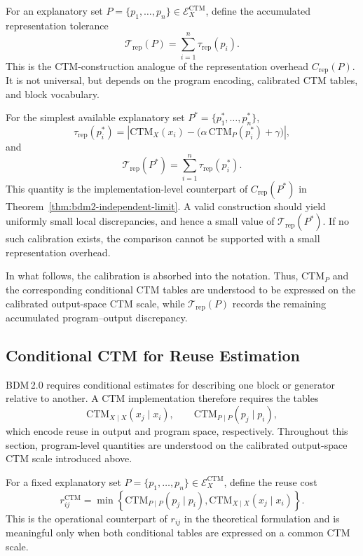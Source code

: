 \documentclass{article}
\begin{document}
For an explanatory set \(P=\{p_1,\ldots,p_n\}\in\mathcal E_X^{\mathrm{CTM}}\), define the accumulated representation tolerance 
\[ 
\mathcal T_{\mathrm{rep}}(P)
=
\sum_{i=1}^{n}\tau_{\mathrm{rep}}(p_i). 
\]
This is the CTM-construction analogue of the representation overhead \(C_{\mathrm{rep}}(P)\). It is not universal, but depends on the program encoding, calibrated CTM tables, and block vocabulary.

For the simplest available explanatory set \(P^*=\{p_1^*,\ldots,p_n^*\}\),
\[
\tau_{\mathrm{rep}}(p_i^*)
=
\left|
\mathrm{CTM}_X(x_i)
-
\bigl(\alpha\,\mathrm{CTM}_P(p_i^*)+\gamma\bigr)
\right|,
\]
and
\[
\mathcal T_{\mathrm{rep}}(P^*)
=
\sum_{i=1}^{n}\tau_{\mathrm{rep}}(p_i^*).
\]
This quantity is the implementation-level counterpart of \(C_{\mathrm{rep}}(P^*)\) in Theorem~\ref{thm:bdm2-independent-limit}. A valid construction should yield uniformly small local discrepancies, and hence a small value of \(\mathcal T_{\mathrm{rep}}(P^*)\). If no such calibration exists, the comparison cannot be supported with a small representation overhead.

In what follows, the calibration is absorbed into the notation. Thus, \(\mathrm{CTM}_P\) and the corresponding conditional CTM tables are understood to be expressed on the calibrated output-space CTM scale, while \(\mathcal T_{\mathrm{rep}}(P)\) records the remaining accumulated program--output discrepancy.


\subsection{Conditional CTM for Reuse Estimation}

BDM\,2.0 requires conditional estimates for describing one block or generator relative to another. A CTM implementation therefore requires the tables
\[
\mathrm{CTM}_{X\mid X}(x_j\mid x_i),
\qquad
\mathrm{CTM}_{P\mid P}(p_j\mid p_i),
\]
which encode reuse in output and program space, respectively. Throughout this section, program-level quantities are understood on the calibrated output-space CTM scale introduced above.

For a fixed explanatory set \(P=\{p_1,\ldots,p_n\}\in\mathcal E_X^{\mathrm{CTM}}\), define the reuse cost
\[
r_{ij}^{\mathrm{CTM}}
=
\min
\left\{
\mathrm{CTM}_{P\mid P}(p_j\mid p_i),
\mathrm{CTM}_{X\mid X}(x_j\mid x_i)
\right\}.
\]
This is the operational counterpart of \(r_{ij}\) in the theoretical formulation and is meaningful only when both conditional tables are expressed on a common CTM scale.
\end{document}
